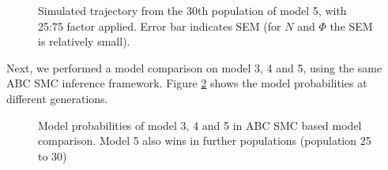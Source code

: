 \begin{figure}[H]
    \begin{center}
    \end{center}

    \caption[Simulated trajectory from the 30th population of model 5, with 25:75 factor applied]{Simulated trajectory from the 30th population of model 5, with 25:75 factor applied. Error bar indicates SEM (for $N$ and $\Phi$ the SEM is relatively small).}
    \label{fig:overfit}
\end{figure}


Next, we performed a model comparison on model 3, 4 and 5, using the same ABC SMC inference framework. Figure \ref{fig:model345cmp} shows the model probabilities at different generations.

\begin{figure}[H]
    \begin{center}
    \end{center}

    \caption[Model probabilities of model 3, 4 and 5 in ABC SMC based model comparison]{Model probabilities of model 3, 4 and 5 in ABC SMC based model comparison. Model 5 also wins in further populations (population 25 to 30)}
    \label{fig:model345cmp}
\end{figure}


